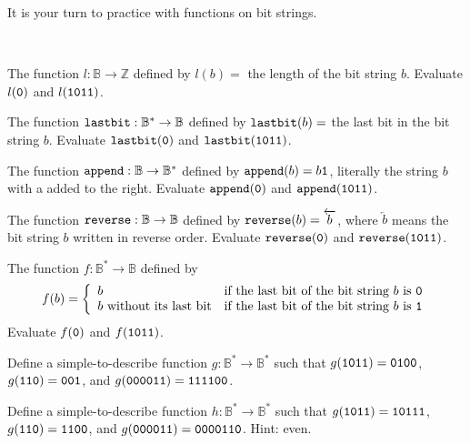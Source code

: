 It is your turn to practice with functions on bit strings.

\begin{act}
\label{act_functions_bit_strings}
~
        \begin{apart}   
            \item The function $l:\mathbb{B} \to \mathbb{Z}$ defined by $l(b) =$ the length of the bit string $b$. Evaluate $l(\texttt{0})$ and $l(\texttt{1011})$.
            
            \item The function $\texttt{lastbit}:\mathbb{B}^* \to \mathbb{B}$ defined by $\texttt{lastbit}(b) =$ the last bit in the bit string $b$. Evaluate $\texttt{lastbit}(\texttt{0})$ and $\texttt{lastbit}(\texttt{1011})$.
            
            \item The function $\texttt{append}: \mathbb{B}\to \mathbb{B}^*$ defined by $\texttt{append}(b)=b\texttt{1}$, literally the string $b$ with a  added to the right. Evaluate $\texttt{append}(\texttt{0})$ and $\texttt{append}(\texttt{1011})$.

            \item The function $\texttt{reverse}:\mathbb{B}\to \mathbb{B}$ defined by $\texttt{reverse}(b)=\overleftarrow{b}$, where $\overleftarrow{b}$ means the bit string $b$ written in reverse order. Evaluate $\texttt{reverse}(\texttt{0})$ and $\texttt{reverse}(\texttt{1011})$.

            \item The function $f:\mathbb{B}^*\to \mathbb{B}$ defined by $$f(b)= \left\{ \begin{array} {ll} b & \text{if the last bit of the bit string } b \text{ is } \texttt{0} \\ b \text{ without its last  bit}  & \text{if the last bit of the bit string } b \text{ is } \texttt{1} \\  \end{array} \right.$$ Evaluate $f(\texttt{0})$ and $f(\texttt{1011})$.

            \item Define a simple-to-describe function $g:\mathbb{B}^*\to \mathbb{B}^*$ such that $g(\texttt{1011}) = \texttt{0100}$, $g(\texttt{110})= \texttt{001}$, and $g(\texttt{000011}) = \texttt{111100}$. %

            \item Define a simple-to-describe function $h:\mathbb{B}^*\to \mathbb{B}^*$ such that $g(\texttt{1011}) = \texttt{10111}$, $g(\texttt{110})= \texttt{1100}$, and $g(\texttt{000011}) = \texttt{0000110}$.  Hint: even. %
        \end{apart}
\end{act}

